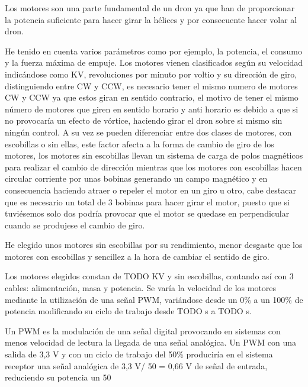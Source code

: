 
Los motores son una parte fundamental de un dron ya que han de proporcionar la potencia suficiente para hacer girar la hélices y por consecuente hacer volar al dron. 
                
 He tenido en cuenta varios parámetros como por ejemplo, la potencia, el consumo y la fuerza máxima de empuje. Los motores vienen clasificados según su velocidad indicándose como KV, revoluciones por minuto por voltio y su dirección de giro, distinguiendo entre CW y CCW, es necesario tener el mismo numero de motores CW y CCW ya que estos giran en sentido contrario, el motivo de tener el mismo número de motores que giren en sentido horario y anti horario es debido a que si no provocaría un efecto de vórtice, haciendo girar el dron sobre si mismo sin ningún control. A su vez se pueden diferenciar entre dos clases de motores, con escobillas o sin ellas, este factor afecta a la forma de cambio de giro de los motores, los motores sin escobillas llevan un sistema de carga de polos magnéticos para realizar el cambio de dirección mientras que los motores con escobillas hacen circular corriente por unas bobinas generando un campo magnético y en consecuencia haciendo atraer o repeler el motor en un giro u otro, cabe destacar que es necesario un total de 3 bobinas para hacer girar el motor, puesto que si tuviésemos solo dos podría provocar que el motor se quedase en perpendicular cuando se produjese el cambio de giro.
                
 He elegido unos motores sin escobillas por su rendimiento, menor desgaste que los motores con escobillas y sencillez a la hora de cambiar el sentido de giro. 
                
 Los motores elegidos constan de TODO KV y sin escobillas, contando así con 3 cables: alimentación, masa y potencia. Se varía la velocidad de los motores mediante la utilización de una señal PWM, variándose desde un 0\% a un 100\% de potencia modificando su ciclo de trabajo desde TODO s a TODO s.
 
 Un PWM es la modulación de una señal digital provocando en sistemas con menos velocidad de lectura la llegada de una señal analógica. Un PWM con una salida de 3,3 V y con un ciclo de trabajo del 50\% produciría en el sistema receptor una señal analógica de 3,3 V/ 50 = 0,66 V de señal de entrada, reduciendo su potencia un 50%